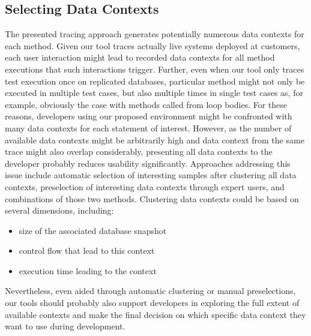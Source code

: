 \subsection{Selecting Data Contexts}
The presented tracing approach generates potentially numerous data contexts for each method.
Given our tool traces actually live systems deployed at customers, each user interaction might lead to recorded data contexts for all method executions that such interactions trigger.
Further, even when our tool only traces test execution once on replicated databases, particular method might not only be executed in multiple test cases, but also multiple times in single test cases as, for example, obviously the case with methods called from loop bodies.
For these reasons, developers using our proposed environment might be confronted with many data contexts for each statement of interest.
However, as the number of available data contexts might be arbitrarily high and data context from the same trace might also overlap considerably, presenting all data contexts to the developer probably reduces usability significantly.
Approaches addressing this issue include automatic selection of interesting samples after clustering all data contexts, preselection of interesting data contexts through expert users, and combinations of those two methods.
Clustering data contexts could be based on several dimensions, including:
\begin{itemize}
  \item size of the associated database snapshot
  \item control flow that lead to this context
  \item execution time leading to the context
\end{itemize}
Nevertheless, even aided through automatic clustering or manual preselections, our tools should probably also support developers in exploring the full extent of available contexts and make the final decision on which specific data context they want to use during development.